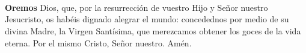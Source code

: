 \\[1mm]
\\[1mm]
\\[2mm]
\textbf{Oremos}
 Dios, que, por la resurrección de vuestro Hijo y Señor nuestro Jesucristo,
os habéis dignado alegrar el mundo: concedednos por medio de su divina Madre, la Virgen Santísima,
que merezcamos obtener los goces de la vida eterna. Por el mismo Cristo, Señor nuestro. Amén.